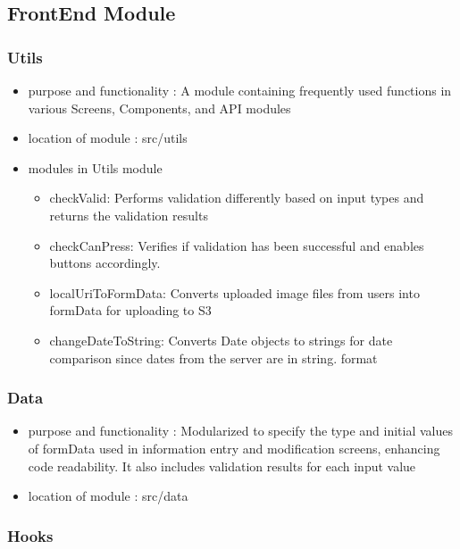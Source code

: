 \documentclass[conference]{IEEEtran}
\begin{document}
\subsection{FrontEnd Module}

\subsubsection{Utils}

\begin{itemize}
    \item purpose and functionality : A module containing frequently used functions in various Screens, Components, and API modules
    \item location of module : src/utils
    \item modules in Utils module
    \begin{itemize}
        \item checkValid: Performs validation differently based on input types and returns the validation results
        \item checkCanPress: Verifies if validation has been successful and enables buttons accordingly.
        \item localUriToFormData: Converts uploaded image files from users into formData for uploading to S3
        \item changeDateToString: Converts Date objects to strings for date comparison since dates from the server are in string. format
        \vspace{0.5cm}
    \end{itemize}
\end{itemize}
\subsubsection{Data}
\begin{itemize}
    \item purpose and functionality : Modularized to specify the type and initial values of formData used in information entry and modification screens, enhancing code readability. It also includes validation results for each input value
    \item location of module : src/data
    \vspace{0.5cm}
\end{itemize}

\subsubsection{Hooks}
\end{document}
